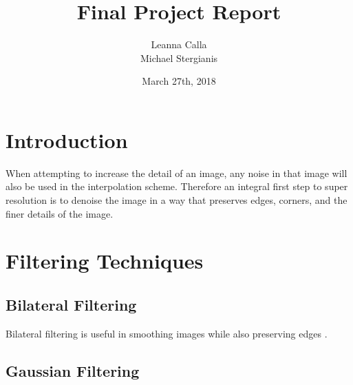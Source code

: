 \documentclass{article}
\title{Final Project Report}
\author{Leanna Calla \\ Michael Stergianis}
\date{March 27th, 2018}
\begin{document}
\maketitle
%
\section{Introduction}
\begin{flushleft}
  When attempting to increase the detail of an image, any noise in
  that image will also be used in the interpolation scheme. Therefore
  an integral first step to super resolution is to denoise the image
  in a way that preserves edges, corners, and the finer details of the
  image.
\end{flushleft}
%
\section{Filtering Techniques}
\subsection{Bilateral Filtering}
Bilateral filtering is useful in smoothing images while also
preserving edges \cite{Paris}.
\subsection{Gaussian Filtering}
\end{document}

